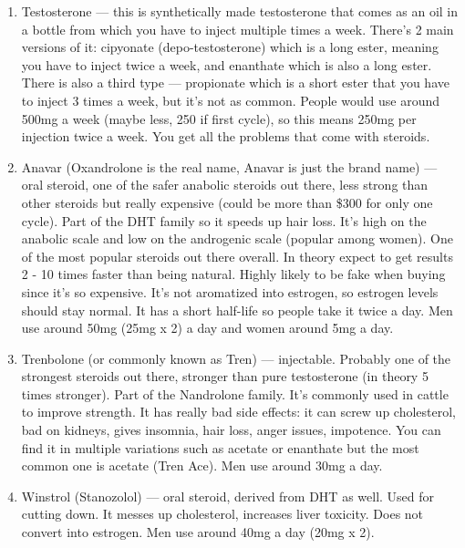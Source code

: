 \documentclass[openany, 12pt]{book}
\begin{document}
	\begin{enumerate}

		\item Testosterone --- this is synthetically made testosterone that comes as an oil in a bottle from which you have to inject multiple times a week. There's 2 main versions of it:
                  cipyonate (depo-testosterone) which is a long ester, meaning you have to inject twice a week, and enanthate which is also a long ester. There is also a third type --- propionate
                  which is a short ester that you have to inject 3 times a week, but it's not as common. People would use around 500mg a week (maybe less, 250 if first cycle), so this means 250mg per
                  injection twice a week. You get all the problems that come with steroids.
                    
		\item Anavar (Oxandrolone is the real name, Anavar is just the brand name) --- oral steroid,
                  one of the safer anabolic steroids out there, less strong than other steroids but really expensive
                  (could be more than \$300 for only one cycle). Part of the DHT family so it speeds up hair loss.
                  It's high on the anabolic scale and low on the androgenic scale (popular among women). One of the most popular steroids out there overall.
                  In theory expect to get results 2 - 10 times faster than being natural. Highly likely to be fake when buying since it's so expensive.
                  It's not aromatized into estrogen, so estrogen levels should stay normal.
                  It has a short half-life so people take it twice a day. Men use around 50mg (25mg x 2) a day and women around 5mg a day.

		\item Trenbolone (or commonly known as Tren) --- injectable. Probably one of the strongest steroids out there, stronger than pure testosterone (in theory 5 times stronger).
                  Part of the Nandrolone family. It's commonly used in cattle to improve strength.
                  It has really bad side effects: it can screw up cholesterol, bad on kidneys, gives insomnia, hair loss, anger issues, impotence. You can find it in multiple
                  variations such as acetate or enanthate but the most common one is acetate (Tren Ace). Men use around 30mg a day.

		\item Winstrol (Stanozolol) --- oral steroid, derived from DHT as well. Used for cutting down. It messes up cholesterol, increases liver toxicity. Does not convert into estrogen.
                  Men use around 40mg a day (20mg x 2).


\end{enumerate}
\end{document}
